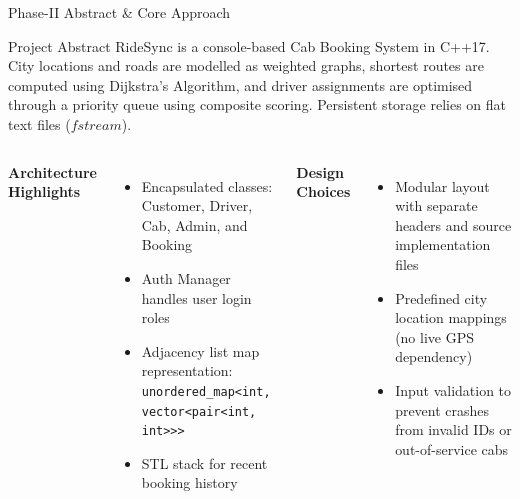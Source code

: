 \documentclass[aspectratio=169,11pt]{beamer}
\begin{document}
\begin{frame}{Phase-II Abstract \& Core Approach}

\vspace{-3mm}

\begin{block}{Project Abstract}
\scriptsize
RideSync is a console-based Cab Booking System in C++17. City locations and roads are modelled as weighted graphs, shortest routes are computed using Dijkstra's Algorithm, and driver assignments are optimised through a priority queue using composite scoring. Persistent storage relies on flat text files ($fstream$).
\end{block}

\vspace{1mm}

\begin{columns}[T,totalwidth=\textwidth]

\textbf{\color{GEUBlue}Architecture Highlights}
\begin{itemize}\itemsep1pt
\item \footnotesize Encapsulated classes: Customer, Driver, Cab, Admin, and Booking
\item \footnotesize Auth Manager handles user login roles
\item \footnotesize Adjacency list map representation: \texttt{unordered\_map<int, vector<pair<int, int>>>}
\item \footnotesize STL stack for recent booking history
\end{itemize}

\textbf{\color{GEUBlue}Design Choices}
\begin{itemize}\itemsep1pt
\item \footnotesize Modular layout with separate headers and source implementation files
\item \footnotesize Predefined city location mappings (no live GPS dependency)
\item \footnotesize Input validation to prevent crashes from invalid IDs or out-of-service cabs
\end{itemize}

\end{columns}

\end{frame}
\end{document}
